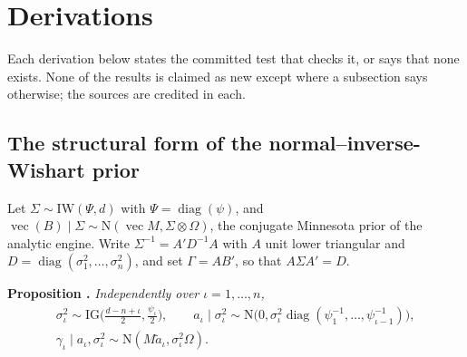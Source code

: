 \section{Derivations}\label{app:derivations}

Each derivation below states the committed test that checks it, or says that none exists.
None of the results is claimed as new except where a subsection says otherwise; the sources are
credited in each.

\subsection{The structural form of the normal--inverse-Wishart prior}\label{app:niw-structural}

Let $\Sigma \sim \mathrm{IW}(\Psi, d)$ with $\Psi = \operatorname{diag}(\psi)$, and
$\operatorname{vec}(B) \mid \Sigma \sim \mathrm{N}(\operatorname{vec} M, \Sigma \otimes \Omega)$, the
conjugate Minnesota prior of the analytic engine.
Write $\Sigma^{-1} = A' D^{-1} A$ with $A$ unit lower triangular and $D =
\operatorname{diag}(\sigma_1^2, \dots, \sigma_n^2)$, and set $\Gamma = A B'$, so that
$A\Sigma A' = D$.

\medskip\noindent\textbf{Proposition \thesubsection.}\label{prop:niw-structural} \textit{Independently over $\iota = 1, \dots, n$,}
\begin{equation}\label{eq:niw-structural}
\begin{gathered}
\sigma_\iota^2 \sim \mathrm{IG}\Big(\frac{d - n + \iota}{2}, \frac{\psi_\iota}{2}\Big), \qquad
a_\iota \mid \sigma_\iota^2 \sim \mathrm{N}\big(0, \sigma_\iota^2 \operatorname{diag}(\psi_1^{-1},
\dots, \psi_{\iota-1}^{-1})\big), \\
\gamma_\iota \mid a_\iota, \sigma_\iota^2 \sim \mathrm{N}(M\tilde a_\iota, \sigma_\iota^2 \Omega).
\end{gathered}
\end{equation}

